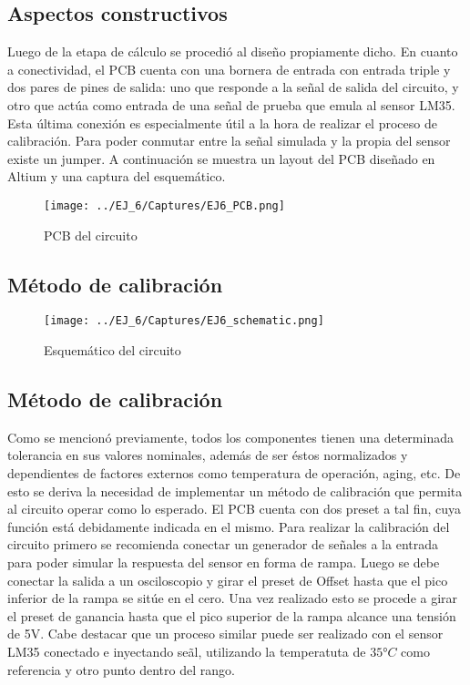  \subsection{Aspectos constructivos}

 Luego de la etapa de c\'alculo se procedi\'o al dise\~no propiamente dicho. En cuanto a conectividad, el PCB cuenta con una bornera de entrada con entrada triple y dos pares de pines de salida: uno que responde a la señal de salida del circuito, y otro que actúa como entrada de una señal de prueba que emula al sensor LM35.
  Esta \'ultima conexi\'on es especialmente \'util a la hora de realizar el proceso de calibraci\'on. Para poder conmutar entre la se\~nal simulada y la propia del sensor existe un jumper. A continuaci\'on se muestra un layout del PCB diseñado en Altium y una captura del esquem\'atico.
 
  \begin{figure}[H]
    \centering
    \texttt{[image: ../EJ\_6/Captures/EJ6\_PCB.png]}
    \caption{PCB del circuito}
    \label{fig:EJ6_PCB} 
\end{figure}
 \subsection{M\'etodo de calibraci\'on}

 \begin{figure}[H]
    \centering
    \texttt{[image: ../EJ\_6/Captures/EJ6\_schematic.png]}
    \caption{Esquem\'atico del circuito}
    \label{fig:EJ6_schematic} 
\end{figure}

 \subsection{M\'etodo de calibraci\'on}

 Como se mencion\'o previamente, todos los componentes tienen una determinada tolerancia en sus valores nominales, adem\'as de ser \'estos normalizados y dependientes de factores externos como temperatura de operaci\'on, aging, etc.
  De esto se deriva la necesidad de implementar un m\'etodo de calibraci\'on que permita al circuito operar como lo esperado. El PCB cuenta con dos preset a tal fin, cuya funci\'on est\'a debidamente indicada en el mismo.
  Para realizar la calibraci\'on del circuito primero se recomienda conectar un generador de señales a la entrada para poder simular la respuesta del sensor en forma de rampa.
 Luego se debe conectar la salida a un osciloscopio y girar el preset de Offset hasta que el pico inferior de la rampa se sit\'ue en el cero. Una vez realizado esto se procede a girar el preset de ganancia hasta que el pico superior de la rampa alcance una tensi\'on de 5V.
  Cabe destacar que un proceso similar puede ser realizado con el sensor LM35 conectado e inyectando se\~al, utilizando la temperatuta de $35°C$ como referencia y otro punto dentro del rango.

